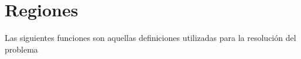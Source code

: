 \section{Regiones}
    Las siguientes funciones son aquellas definiciones utilizadas para la resolución del problema
  
    
